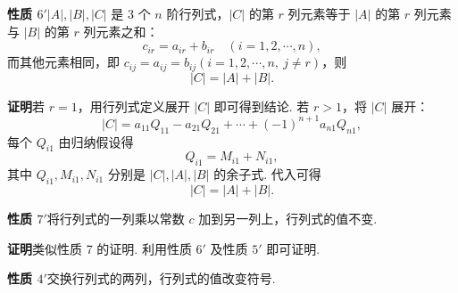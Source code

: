 \documentclass[UTF8,12pt,a4paper,fontset=fandol]{ctexart}
\begin{document}
\noindent\textbf{性质 $6'$}\quad $|A|,|B|,|C|$ 是 3 个 $n$ 阶行列式，$|C|$ 的第 $r$ 列元素等于 $|A|$ 的第 $r$ 列元素与 $|B|$ 的第 $r$ 列元素之和：
\[
c_{ir}=a_{ir}+b_{ir}\quad (i=1,2,\cdots,n),
\]
而其他元素相同，即 $c_{ij}=a_{ij}=b_{ij}(i=1,2,\cdots,n,\ j\ne r)$，则
\[
|C|=|A|+|B|.
\]

\noindent\textbf{证明}\quad 若 $r=1$，用行列式定义展开 $|C|$ 即可得到结论. 若 $r>1$，将 $|C|$ 展开：
\[
|C|=a_{11}Q_{11}-a_{21}Q_{21}+\cdots+(-1)^{n+1}a_{n1}Q_{n1},
\]
每个 $Q_{i1}$ 由归纳假设得
\[
Q_{i1}=M_{i1}+N_{i1},
\]
其中 $Q_{i1},M_{i1},N_{i1}$ 分别是 $|C|,|A|,|B|$ 的余子式. 代入可得
\[
|C|=|A|+|B|.
\]

\noindent\textbf{性质 $7'$}\quad 将行列式的一列乘以常数 $c$ 加到另一列上，行列式的值不变.

\noindent\textbf{证明}\quad 类似性质 7 的证明. 利用性质 $6'$ 及性质 $5'$ 即可证明.

\noindent\textbf{性质 $4'$}\quad 交换行列式的两列，行列式的值改变符号.
\end{document}

